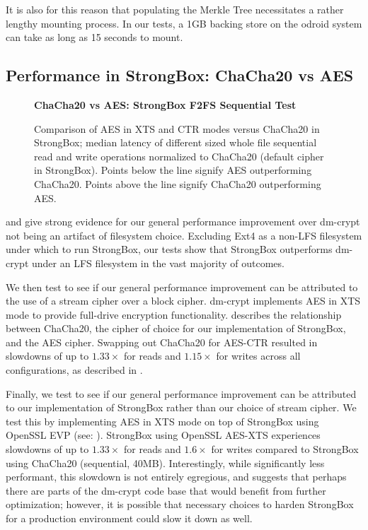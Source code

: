 It is also for this reason that populating the Merkle Tree necessitates a rather
lengthy mounting process. In our tests, a 1GB backing store on the odroid system
can take as long as 15 seconds to mount.

\subsection{Performance in StrongBox: ChaCha20 vs AES}
\begin{figure}[t]
    \textbf{ChaCha20 vs AES: StrongBox F2FS Sequential Test}\par\medskip
    \centering
    {}
    \caption{Comparison of AES in XTS and CTR modes versus ChaCha20 in
      StrongBox; median latency of different sized whole file
      sequential read and write operations normalized to ChaCha20
      (default cipher in StrongBox). Points below the line signify AES
      outperforming ChaCha20. Points above the line signify ChaCha20
      outperforming AES.}
   \label{fig:microbench-aes-vs-chacha}
\end{figure}
 and  give strong evidence for
our general performance improvement over dm-crypt not being an artifact of
filesystem choice. Excluding Ext4 as a non-LFS filesystem under which to run
StrongBox, our tests show that StrongBox outperforms dm-crypt under an LFS
filesystem in the vast majority of outcomes.

We then test to see if our general performance improvement can be attributed to
the use of a stream cipher over a block cipher. dm-crypt implements AES in XTS
mode to provide full-drive encryption functionality.
 describes the relationship between ChaCha20,
the cipher of choice for our implementation of StrongBox, and the AES cipher.
Swapping out ChaCha20 for AES-CTR resulted in slowdowns of up to $1.33\times$
for reads and $1.15\times$ for writes across all configurations, as described in
.

Finally, we test to see if our general performance improvement can be attributed
to our implementation of StrongBox rather than our choice of stream cipher. We
test this by implementing AES in XTS mode on top of StrongBox using OpenSSL EVP
(see: ). StrongBox using OpenSSL AES-XTS
experiences slowdowns of up to $1.33\times$ for reads and $1.6\times$ for writes
compared to StrongBox using ChaCha20 (sequential, 40MB). Interestingly, while
significantly less performant, this slowdown is not entirely egregious, and
suggests that perhaps there are parts of the dm-crypt code base that would
benefit from further optimization; however, it is possible that necessary
choices to harden StrongBox for a production environment could slow it down as
well.

